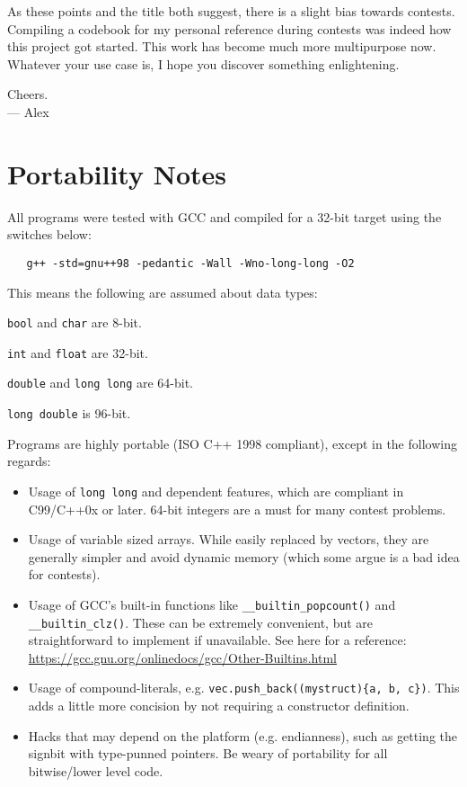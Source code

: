 \documentclass[11pt,letterpaper,twoside]{book}
\begin{document}
As these points and the title both suggest, there is a slight bias towards contests. Compiling a codebook for my personal reference during contests was indeed how this project got started. This work has become much more multipurpose now. Whatever your use case is, I hope you discover something enlightening.

\begin{flushright}
Cheers.\\
--- Alex
\end{flushright}

\section*{Portability Notes}

All programs were tested with GCC and compiled for a 32-bit target using the switches below:

\begin{verbatim}
   g++ -std=gnu++98 -pedantic -Wall -Wno-long-long -O2
\end{verbatim}

This means the following are assumed about data types:

\begin{compactitem}
	\item \texttt{bool} and \texttt{char} are 8-bit.
	\item \texttt{int} and \texttt{float} are 32-bit.
	\item \texttt{double} and \texttt{long long} are 64-bit.
	\item \texttt{long double} is 96-bit.
\end{compactitem}
\vspace{5pt}

Programs are highly portable (ISO C++ 1998 compliant), except in the following regards:

\begin{itemize}
	\item Usage of \texttt{long long} and dependent features, which are compliant in C99/C++0x or later. 64-bit integers are a must for many contest problems.
	\item Usage of variable sized arrays. While easily replaced by vectors, they are generally simpler and avoid dynamic memory (which some argue is a bad idea for contests).
	\item Usage of GCC's built-in functions like \texttt{\_\_builtin\_popcount()} and \texttt{\_\_builtin\_clz()}. These can be extremely convenient, but are straightforward to implement if unavailable. See here for a reference: \url{https://gcc.gnu.org/onlinedocs/gcc/Other-Builtins.html}
	\item Usage of compound-literals, e.g. \texttt{vec.push\_back((mystruct)\{a, b, c\})}. This adds a little more concision by not requiring a constructor definition.
	\item Hacks that may depend on the platform (e.g. endianness), such as getting the signbit with type-punned pointers. Be weary of portability for all bitwise/lower level code.
\end{itemize}

\tableofcontents

\mainmatter







\backmatter

\printindex
\end{document}
